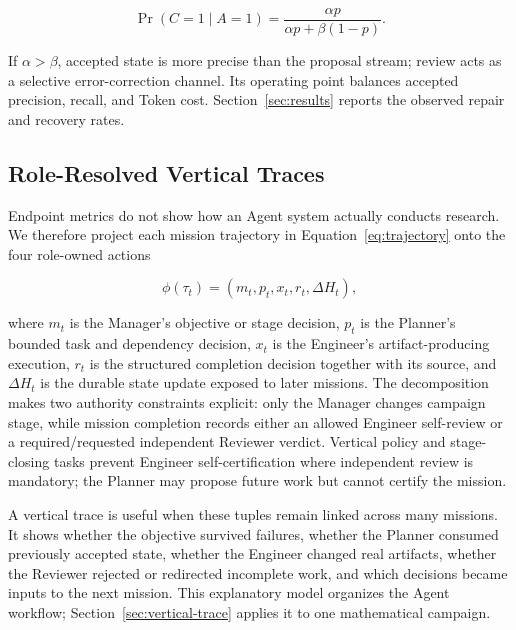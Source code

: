\begin{equation}
  \Pr(C=1\mid A=1)
  =\frac{\alpha p}{\alpha p+\beta(1-p)}.
  \label{eq:review-precision}
\end{equation}

If $\alpha>\beta$, accepted state is more precise than the proposal stream; review
acts as a selective error-correction channel. Its operating point balances accepted
precision, recall, and Token cost. Section~\ref{sec:results} reports the observed
repair and recovery rates.

\subsection{Role-Resolved Vertical Traces}

Endpoint metrics do not show how an Agent system actually conducts research. We
therefore project each mission trajectory in Equation~\ref{eq:trajectory} onto
the four role-owned actions

\begin{equation}
  \phi(\tau_t)=\left(m_t,p_t,x_t,r_t,\Delta H_t\right),
  \label{eq:role-resolved-trace}
\end{equation}

where $m_t$ is the Manager's objective or stage decision, $p_t$ is the Planner's
bounded task and dependency decision, $x_t$ is the Engineer's artifact-producing
execution, $r_t$ is the structured completion decision together with its source,
and $\Delta H_t$ is the durable state update exposed to later missions. The
decomposition makes two authority constraints explicit: only the Manager changes
campaign stage, while mission completion records either an allowed Engineer
self-review or a required/requested independent Reviewer verdict. Vertical policy
and stage-closing tasks prevent Engineer self-certification where independent
review is mandatory; the Planner may propose future work but cannot certify the
mission.

A vertical trace is useful when these tuples remain linked across many missions.
It shows whether the objective survived failures, whether the Planner consumed
previously accepted state, whether the Engineer changed real artifacts, whether
the Reviewer rejected or redirected incomplete work, and which decisions became
inputs to the next mission. This explanatory model organizes the Agent workflow;
Section~\ref{sec:vertical-trace} applies it to one mathematical campaign.
